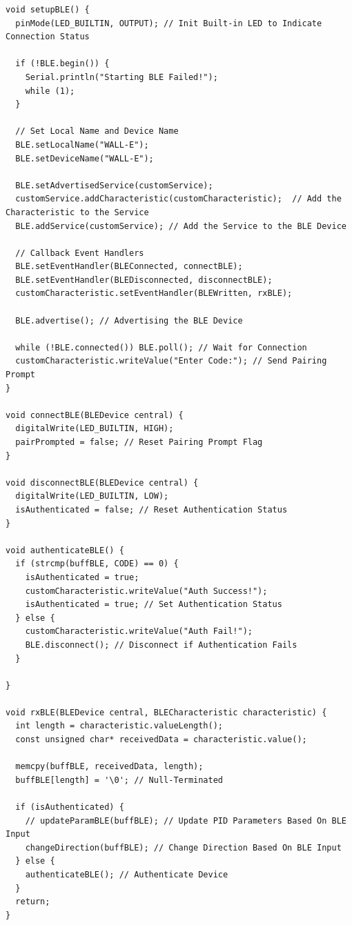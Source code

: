 \documentclass{article}
\begin{document}
\begin{lstlisting}[caption={Arduino BLE Firmware Implementation}, label={lst:arduino_ble_code}]
void setupBLE() {
  pinMode(LED_BUILTIN, OUTPUT); // Init Built-in LED to Indicate Connection Status

  if (!BLE.begin()) {
    Serial.println("Starting BLE Failed!");
    while (1);
  }

  // Set Local Name and Device Name
  BLE.setLocalName("WALL-E");
  BLE.setDeviceName("WALL-E");

  BLE.setAdvertisedService(customService);
  customService.addCharacteristic(customCharacteristic);  // Add the Characteristic to the Service
  BLE.addService(customService); // Add the Service to the BLE Device

  // Callback Event Handlers
  BLE.setEventHandler(BLEConnected, connectBLE);
  BLE.setEventHandler(BLEDisconnected, disconnectBLE);
  customCharacteristic.setEventHandler(BLEWritten, rxBLE);

  BLE.advertise(); // Advertising the BLE Device

  while (!BLE.connected()) BLE.poll(); // Wait for Connection
  customCharacteristic.writeValue("Enter Code:"); // Send Pairing Prompt
}

void connectBLE(BLEDevice central) {
  digitalWrite(LED_BUILTIN, HIGH);
  pairPrompted = false; // Reset Pairing Prompt Flag
}

void disconnectBLE(BLEDevice central) {
  digitalWrite(LED_BUILTIN, LOW);
  isAuthenticated = false; // Reset Authentication Status
}

void authenticateBLE() {
  if (strcmp(buffBLE, CODE) == 0) {
    isAuthenticated = true;
    customCharacteristic.writeValue("Auth Success!");
    isAuthenticated = true; // Set Authentication Status
  } else {
    customCharacteristic.writeValue("Auth Fail!");
    BLE.disconnect(); // Disconnect if Authentication Fails
  }

}

void rxBLE(BLEDevice central, BLECharacteristic characteristic) {
  int length = characteristic.valueLength();
  const unsigned char* receivedData = characteristic.value();

  memcpy(buffBLE, receivedData, length);
  buffBLE[length] = '\0'; // Null-Terminated

  if (isAuthenticated) {
    // updateParamBLE(buffBLE); // Update PID Parameters Based On BLE Input
    changeDirection(buffBLE); // Change Direction Based On BLE Input
  } else {
    authenticateBLE(); // Authenticate Device
  }
  return;
}
\end{lstlisting}
\end{document}
